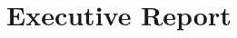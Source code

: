 \documentclass[justified]{tufte-book}
\begin{document}
\chapter{Executive Report}

\lipsum[1]
\sidenote{\RaggedRight \protect\lipsum[5]}
\centering
\begin{minipage}{5cm}
\RaggedRight

\lipsum[1]
\end{minipage}
\end{document}

